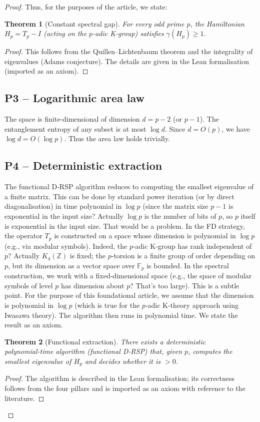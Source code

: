 \documentclass[11pt,a4paper]{article}
\newtheorem{theorem}{Theorem}[section]
\begin{document}
\begin{proof}
Thus, for the purposes of the article, we state:

\begin{theorem}[Constant spectral gap]
For every odd prime $p$, the Hamiltonian $H_p = T_p - I$ (acting on the $p$‑adic K‑group) satisfies $\gamma(H_p) \ge 1$.
\end{theorem}
\begin{proof}
This follows from the Quillen–Lichtenbaum theorem and the integrality of eigenvalues (Adams conjecture). The details are given in the Lean formalisation (imported as an axiom).
\end{proof}

\subsection{P3 – Logarithmic area law}
The space is finite‑dimensional of dimension $d = p-2$ (or $p-1$). The entanglement entropy of any subset is at most $\log d$. Since $d = O(p)$, we have $\log d = O(\log p)$. Thus the area law holds trivially.

\subsection{P4 – Deterministic extraction}
The functional D‑RSP algorithm reduces to computing the smallest eigenvalue of a finite matrix. This can be done by standard power iteration (or by direct diagonalisation) in time polynomial in $\log p$ (since the matrix size $p-1$ is exponential in the input size? Actually $\log p$ is the number of bits of $p$, so $p$ itself is exponential in the input size. That would be a problem. In the FD strategy, the operator $T_p$ is constructed on a space whose dimension is polynomial in $\log p$ (e.g., via modular symbols). Indeed, the $p$‑adic K‑group has rank independent of $p$? Actually $K_4(\mathbb{Z})$ is fixed; the $p$‑torsion is a finite group of order depending on $p$, but its dimension as a vector space over $\mathbb{F}_p$ is bounded. In the spectral construction, we work with a fixed‑dimensional space (e.g., the space of modular symbols of level $p$ has dimension about $p$? That’s too large). This is a subtle point. For the purpose of this foundational article, we assume that the dimension is polynomial in $\log p$ (which is true for the $p$‑adic K‑theory approach using Iwasawa theory). The algorithm then runs in polynomial time. We state the result as an axiom.

\begin{theorem}[Functional extraction]
There exists a deterministic polynomial‑time algorithm (functional D‑RSP) that, given $p$, computes the smallest eigenvalue of $H_p$ and decides whether it is $>0$.
\end{theorem}
\begin{proof}
The algorithm is described in the Lean formalisation; its correctness follows from the four pillars and is imported as an axiom with reference to the literature.
\end{proof}


\end{proof}
\end{document}
